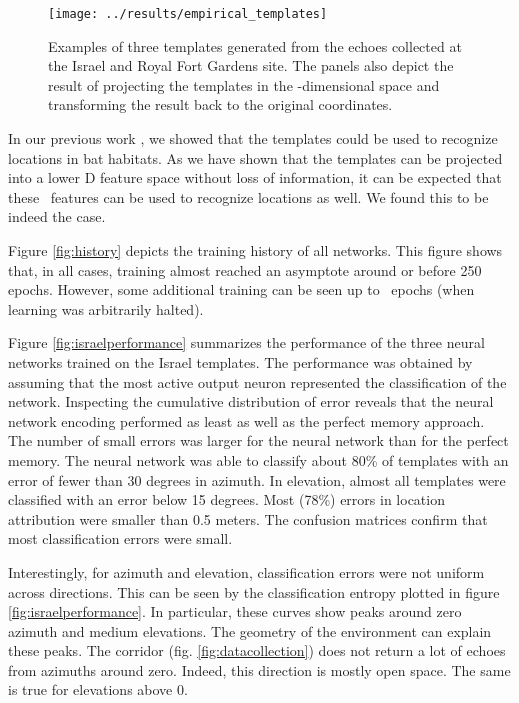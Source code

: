 \documentclass[preprint,5p]{elsarticle}
\begin{document}
\begin{figure}[tb]
	\centering
	\texttt{[image: ../results/empirical\_templates]}
	\caption{Examples of three templates generated from the echoes collected at the Israel and Royal Fort Gardens site. The panels also depict the result of projecting the templates in the 
		\pca-dimensional space and transforming the result back to the original coordinates.}
	\label{fig:empiricaltemplates}
\end{figure}

In our previous work \citep{Vanderelst2016}, we showed that the templates could be used to recognize locations in bat habitats. As we have shown that the templates can be projected into a lower \pca D feature space without loss of information, it can be expected that these \pca\ features can be used to recognize locations as well. We found this to be indeed the case.

Figure \ref{fig:history} depicts the training history of all networks. This figure shows that, in all cases, training almost reached an asymptote around or before 250 epochs. However, some additional training can be seen up to \Epochs\ epochs (when learning was arbitrarily halted).


Figure \ref{fig:israelperformance} summarizes the performance of the three neural networks trained on the Israel templates. The performance was obtained by assuming that the most active output neuron represented the classification of the network. Inspecting the cumulative distribution of error reveals that the neural network encoding performed as least as well as the perfect memory approach. The number of small errors was larger for the neural network than for the perfect memory. The neural network was able to classify about 80\% of templates with an error of fewer than 30 degrees in azimuth. In elevation, almost all templates were classified with an error below 15 degrees. Most (78\%) errors in location attribution were smaller than 0.5 meters. The confusion matrices confirm that most classification errors were small.

Interestingly, for azimuth and elevation, classification errors were not uniform across directions. This can be seen by the classification entropy plotted in figure \ref{fig:israelperformance}. In particular, these curves show  peaks around zero azimuth and medium elevations. The geometry of the environment can explain these peaks. The corridor (fig. \ref{fig:datacollection}) does not return a lot of echoes from azimuths around zero. Indeed, this direction is mostly open space. The same is true for elevations above 0.
\end{document}
